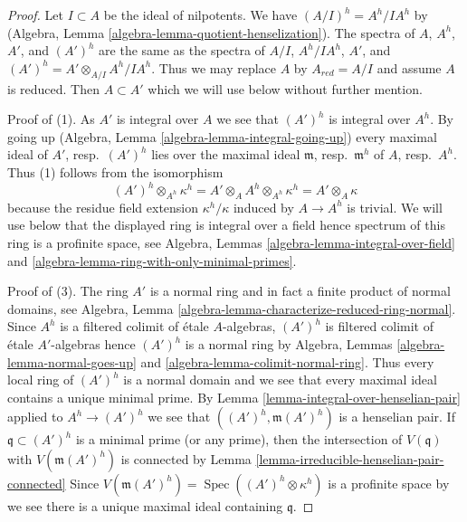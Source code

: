 \documentclass[10pt,a4paper]{amsart}
\theoremstyle{plain}
\theoremstyle{definition}
\theoremstyle{remark}
\numberwithin{equation}{subsection}
\def\Spec{\mathop{\mathrm{Spec}}}
\begin{document}
\begin{proof}
Let $I \subset A$ be the ideal of nilpotents.
We have $(A/I)^h = A^h/IA^h$ by
(Algebra, Lemma \ref{algebra-lemma-quotient-henselization}).
The spectra of $A$, $A^h$, $A'$, and $(A')^h$ are the same
as the spectra of $A/I$, $A^h/IA^h$, $A'$, and
$(A')^h = A' \otimes_{A/I} A^h/IA^h$. Thus
we may replace $A$ by $A_{red} = A/I$ and assume $A$ is reduced.
Then $A \subset A'$ which we will use below without further mention.

\medskip\noindent
Proof of (1). As $A'$ is integral over $A$ we see that $(A')^h$
is integral over $A^h$. By going up
(Algebra, Lemma \ref{algebra-lemma-integral-going-up})
every maximal ideal of $A'$, resp.\ $(A')^h$ lies over
the maximal ideal $\mathfrak m$, resp.\ $\mathfrak m^h$ of
$A$, resp.\ $A^h$. Thus (1) follows from the isomorphism
$$
(A')^h \otimes_{A^h} \kappa^h =
A' \otimes_A A^h \otimes_{A^h} \kappa^h = A' \otimes_A \kappa
$$
because the residue field extension $\kappa^h/\kappa$
induced by $A \to A^h$ is trivial. We will use below that the
displayed ring is integral over a field hence spectrum of
this ring is a profinite space, see
Algebra, Lemmas \ref{algebra-lemma-integral-over-field} and
\ref{algebra-lemma-ring-with-only-minimal-primes}.

\medskip\noindent
Proof of (3). The ring $A'$ is a normal ring and in fact a
finite product of normal domains, see
Algebra, Lemma \ref{algebra-lemma-characterize-reduced-ring-normal}.
Since $A^h$ is a filtered colimit of \'etale $A$-algebras,
$(A')^h$ is filtered colimit of \'etale $A'$-algebras
hence $(A')^h$ is a normal ring by
Algebra, Lemmas \ref{algebra-lemma-normal-goes-up} and
\ref{algebra-lemma-colimit-normal-ring}.
Thus every local ring of $(A')^h$ is a normal domain
and we see that every maximal ideal contains a unique minimal prime.
By Lemma \ref{lemma-integral-over-henselian-pair} applied
to $A^h \to (A')^h$ we see that $((A')^h, \mathfrak m(A')^h)$ is
a henselian pair. If $\mathfrak q \subset (A')^h$
is a minimal prime (or any prime), then the intersection of
$V(\mathfrak q)$ with $V(\mathfrak m (A')^h)$ is connected
by Lemma \ref{lemma-irreducible-henselian-pair-connected}
Since $V(\mathfrak m (A')^h) = \Spec((A')^h \otimes \kappa^h)$
is a profinite space by we see there is a unique
maximal ideal containing $\mathfrak q$.


\end{proof}
\end{document}
